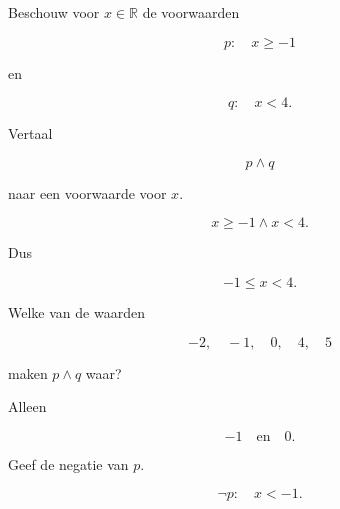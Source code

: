 \documentclass{ximera}
\begin{document}





\begin{oefening}{\oefU \ESS}

Beschouw voor $x\in\mathbb{R}$ de voorwaarden

\[
p:\quad x\geq-1
\]

en

\[
q:\quad x<4.
\]

\begin{question}

Vertaal

\[
p\land q
\]

naar een voorwaarde voor $x$.

\begin{oplossing}

\[
x\geq-1\land x<4.
\]

Dus

\[
-1\leq x<4.
\]

\end{oplossing}

\end{question}



\begin{question}

Welke van de waarden

\[
-2,\quad-1,\quad0,\quad4,\quad5
\]

maken $p\land q$ waar?

\begin{oplossing}

Alleen

\[
-1\quad\text{en}\quad0.
\]

\end{oplossing}

\end{question}



\begin{question}

Geef de negatie van $p$.

\begin{oplossing}

\[
\neg p:\quad x<-1.
\]

\end{oplossing}


\end{question}
\end{oefening}
\end{document}
